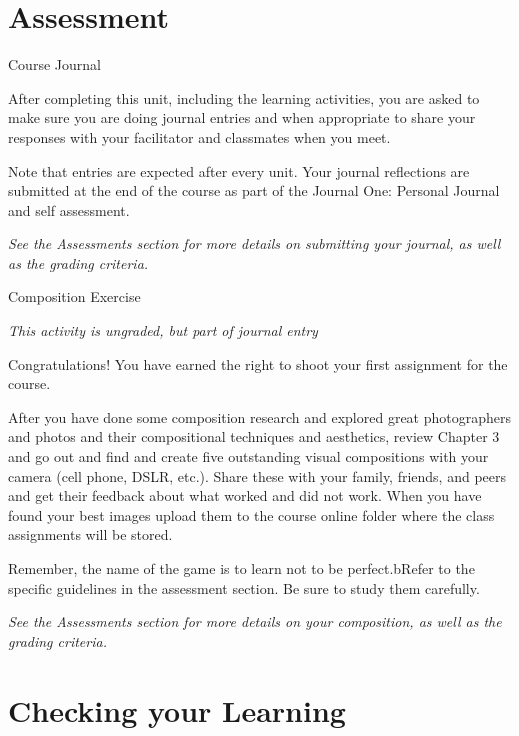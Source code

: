 \documentclass[
]{book}
\begin{document}
\hypertarget{assessment-5}{%
\section*{Assessment}\label{assessment-5}}

\begin{assessment}
{Course Journal}

After completing this unit, including the learning activities, you are asked to make sure you are doing journal entries and when appropriate to share your responses with your facilitator and classmates when you meet.

Note that entries are expected after every unit. Your journal reflections are submitted at the end of the course as part of the Journal One: Personal Journal and self assessment.

\emph{See the Assessments section for more details on submitting your journal, as well as the grading criteria.}

{Composition Exercise}

\emph{This activity is ungraded, but part of journal entry}

Congratulations! You have earned the right to shoot your first assignment for the course.

After you have done some composition research and explored great photographers and photos and their compositional techniques and aesthetics, review Chapter 3 and go out and find and create five outstanding visual compositions with your camera (cell phone, DSLR, etc.). Share these with your family, friends, and peers and get their feedback about what worked and did not work. When you have found your best images upload them to the course online folder where the class assignments will be stored.

Remember, the name of the game is to learn not to be perfect.bRefer to the specific guidelines in the assessment section. Be sure to study them carefully.

\emph{See the Assessments section for more details on your composition, as well as the grading criteria.}
\end{assessment}

\hypertarget{checking-your-learning-2}{%
\section*{Checking your Learning}\label{checking-your-learning-2}}
\end{document}
